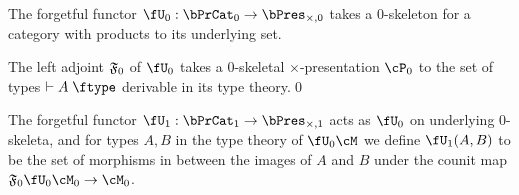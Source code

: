 \begin{defn}\label{thm:catprod-thy-underlying-0}
  The forgetful functor $\fU_0 : \prcat0 \to \timespres0$ takes a 0-skeleton for a category with products to its underlying set.
\end{defn}

\begin{thm}\label{thm:catprod-thy-initial-0}
  The left adjoint $\mathfrak{F}_{0}$ of $\fU_0$ takes a 0-skeletal $\times$-presentation $\cP_0$ to the set of types $\types A\type$ derivable in its type theory.\qed
\end{thm}

\begin{defn}\label{thm:catprod-thy-underlying-1}
  The forgetful functor $\fU_1 : \prcat1 \to \timespres1$ acts as $\fU_0$ on underlying 0-skeleta, and for types $A,B$ in the type theory of $\fU_0\cM$ we define $\fU_1(A,B)$ to be the set of morphisms in \cM between the images of $A$ and $B$ under the counit map $\F0 \fU_0 \cM_0 \to \cM_0$.
\end{defn}

